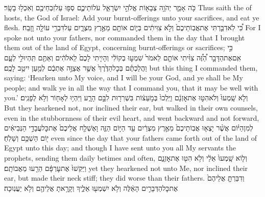 \setcounter{chap}{7}
\setcounter{verse}{21}
{כֹּ֥ה אָמַ֛ר יְהֹוָ֥ה צְבָא֖וֹת אֱלֹהֵ֣י יִשְׂרָאֵ֑ל עֹלוֹתֵיכֶ֛ם סְפ֥וּ עַל\maqqaf זִבְחֵיכֶ֖ם וְאִכְל֥וּ בָשָֽׂר׃}
{Thus saith the \lord\space of hosts, the God of Israel: Add your burnt-offerings unto your sacrifices, and eat ye flesh.}
{כִּ֠י לֹֽא\maqqaf דִבַּ֤רְתִּי אֶת\maqqaf אֲבֽוֹתֵיכֶם֙ וְלֹ֣א צִוִּיתִ֔ים בְּי֛וֹם  אוֹתָ֖ם מֵאֶ֣רֶץ מִצְרָ֑יִם עַל\maqqaf דִּבְרֵ֥י עוֹלָ֖ה וָזָֽבַח׃}
{For I spoke not unto your fathers, nor commanded them in the day that I brought them out of the land of Egypt, concerning burnt-offerings or sacrifices;}
{כִּ֣י אִֽם\maqqaf אֶת\maqqaf הַדָּבָ֣ר הַ֠זֶּ֠ה צִוִּ֨יתִי אוֹתָ֤ם לֵאמֹר֙ שִׁמְע֣וּ בְקוֹלִ֔י וְהָיִ֤יתִי לָכֶם֙ לֵֽאלֹהִ֔ים וְאַתֶּ֖ם תִּֽהְיוּ\maqqaf לִ֣י לְעָ֑ם וַהֲלַכְתֶּ֗ם בְּכׇל\maqqaf הַדֶּ֙רֶךְ֙ אֲשֶׁ֣ר אֲצַוֶּ֣ה אֶתְכֶ֔ם לְמַ֖עַן יִיטַ֥ב לָכֶֽם׃}
{but this thing I commanded them, saying: ‘Hearken unto My voice, and I will be your God, and ye shall be My people; and walk ye in all the way that I command you, that it may be well with you.’}
{וְלֹ֤א שָֽׁמְעוּ֙ וְלֹא\maqqaf הִטּ֣וּ אֶת\maqqaf אׇזְנָ֔ם וַיֵּֽלְכוּ֙ בְּמֹ֣עֵצ֔וֹת בִּשְׁרִר֖וּת לִבָּ֣ם הָרָ֑ע וַיִּהְי֥וּ לְאָח֖וֹר וְלֹ֥א לְפָנִֽים׃}
{But they hearkened not, nor inclined their ear, but walked in their own counsels, even in the stubbornness of their evil heart, and went backward and not forward,}
{לְמִן\maqqaf הַיּ֗וֹם אֲשֶׁ֨ר יָצְא֤וּ אֲבֽוֹתֵיכֶם֙ מֵאֶ֣רֶץ מִצְרַ֔יִם עַ֖ד הַיּ֣וֹם הַזֶּ֑ה וָאֶשְׁלַ֤ח אֲלֵיכֶם֙ אֶת\maqqaf כׇּל\maqqaf עֲבָדַ֣י הַנְּבִיאִ֔ים י֖וֹם הַשְׁכֵּ֥ם וְשָׁלֹֽחַ׃}
{even since the day that your fathers came forth out of the land of Egypt unto this day; and though I have sent unto you all My servants the prophets, sending them daily betimes and often,}
{וְל֤וֹא שָֽׁמְעוּ֙ אֵלַ֔י וְלֹ֥א הִטּ֖וּ אֶת\maqqaf אׇזְנָ֑ם וַיַּקְשׁוּ֙ אֶת\maqqaf עׇרְפָּ֔ם הֵרֵ֖עוּ מֵאֲבוֹתָֽם׃}
{yet they hearkened not unto Me, nor inclined their ear, but made their neck stiff; they did worse than their fathers.}
{וְדִבַּרְתָּ֤ אֲלֵיהֶם֙ אֶת\maqqaf כׇּל\maqqaf הַדְּבָרִ֣ים הָאֵ֔לֶּה וְלֹ֥א יִשְׁמְע֖וּ אֵלֶ֑יךָ וְקָרָ֥אתָ אֲלֵיהֶ֖ם וְלֹ֥א יַעֲנֽוּכָה׃}
